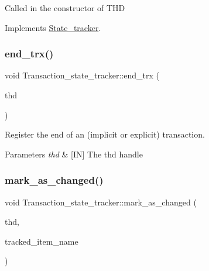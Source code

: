 Called in the constructor of T\+HD 

Implements \mbox{\hyperlink{classState__tracker_a65cd4b0d77f079f4c41620c0bf314939}{State\+\_\+tracker}}.

\mbox{\label{classTransaction__state__tracker_a6c702422b28c51ab3747a4f7fb45fd96}} 
\subsubsection{\texorpdfstring{end\+\_\+trx()}{end\_trx()}}
{\footnotesize\ttfamily void Transaction\+\_\+state\+\_\+tracker\+::end\+\_\+trx (\begin{DoxyParamCaption}\item[{T\+HD $\ast$}]{thd }\end{DoxyParamCaption})}



Register the end of an (implicit or explicit) transaction. 


\begin{DoxyParams}{Parameters}
{\em thd} & \mbox{[}IN\mbox{]} The thd handle \\
\hline
\end{DoxyParams}
\mbox{\label{classTransaction__state__tracker_a5afd4fcf4c13dcaf68811246a153d72f}} 
\subsubsection{\texorpdfstring{mark\+\_\+as\+\_\+changed()}{mark\_as\_changed()}}
{\footnotesize\ttfamily void Transaction\+\_\+state\+\_\+tracker\+::mark\+\_\+as\+\_\+changed (\begin{DoxyParamCaption}\item[{T\+HD $\ast$}]{thd,  }\item[{L\+E\+X\+\_\+\+C\+S\+T\+R\+I\+NG $\ast$}]{tracked\+\_\+item\+\_\+name }\end{DoxyParamCaption})\hspace{0.3cm}{\ttfamily [virtual]}}



